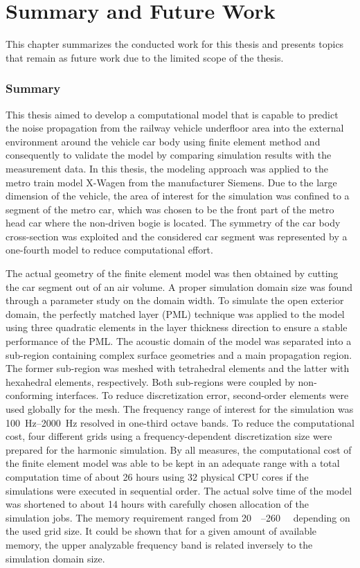 \chapter{Summary and Future Work}
This chapter summarizes the conducted work for this thesis and presents topics that
remain as future work due to the limited scope of the thesis.
\label{chap:summary}
\subsection*{Summary}
This thesis aimed to develop a computational model that is capable to predict the noise propagation from the railway vehicle underfloor area into the external environment around the vehicle car body using finite element method and consequently to validate the model by comparing simulation results with the measurement data.
In this thesis, the modeling approach was applied to the metro train model X-Wagen from the manufacturer Siemens. Due to the large dimension of the vehicle, the area of interest for the simulation was confined to a segment of the metro car, which was chosen to be the front part of the metro head car where the non-driven bogie is located. The symmetry of the car body cross-section was exploited and the considered car segment was represented by a one-fourth model to reduce computational effort.

The actual geometry of the finite element model was then obtained by cutting the car segment out of an air volume. A proper simulation domain size was found through a parameter study on the domain width.
To simulate the open exterior domain, the perfectly matched layer (PML) technique was applied to the model using three quadratic elements in the layer thickness direction to ensure a stable performance of the PML.
The acoustic domain of the model was separated into a sub-region containing complex surface geometries and a main propagation region. The former sub-region was meshed with tetrahedral elements and the latter with hexahedral elements, respectively. Both sub-regions were coupled by non-conforming interfaces. To reduce discretization error, second-order elements were used globally for the mesh.
The frequency range of interest for the simulation was \SIrange{100}{2000}{\hertz} resolved in one-third octave bands. To reduce the computational cost, four different grids using a frequency-dependent discretization size were prepared for the harmonic simulation.
By all measures, the computational cost of the finite element model was able to be kept in an adequate range with a total computation time of about 26 hours using 32 physical CPU cores if the simulations were executed in sequential order. The actual solve time of the model was shortened to about 14 hours with carefully chosen allocation of the simulation jobs. The memory requirement ranged from \SIrange{20}{260}{\giga\byte} depending on the used grid size. It could be shown that for a given amount of available memory, the upper analyzable frequency band is related inversely to the simulation domain size.

